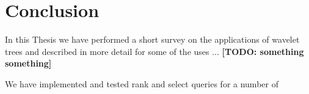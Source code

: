 \section{Conclusion}
In this Thesis we have performed a short survey on the applications of wavelet trees and described in more detail for some of the uses ... \textbf{[TODO: something something]}

We have implemented and tested rank and select queries for a number of 